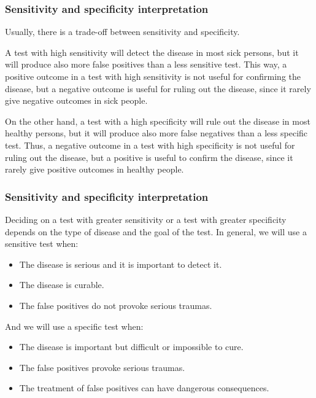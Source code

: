 \begin{frame}
\frametitle{Sensitivity and specificity interpretation}
Usually, there is a trade-off between sensitivity and specificity.  

A test with high sensitivity will detect the disease in most sick persons, but it will produce also more false positives than a less sensitive test. 
This way, a positive outcome in a test with high sensitivity is not useful for confirming the disease, but a negative outcome is useful for ruling out the disease, since it rarely give negative outcomes in sick people.

On the other hand, a test with a high specificity will rule out the disease in most healthy persons, but it will produce also more false negatives than a less specific test. 
Thus, a negative outcome in a test with high specificity is not useful for ruling out the disease, but a positive is useful to confirm the disease, since it rarely give positive outcomes in healthy people.  
\end{frame}


\begin{frame}
\frametitle{Sensitivity and specificity interpretation}
Deciding on a test with greater sensitivity or a test with greater specificity depends on the type of disease and the
goal of the test.
In general, we will use a sensitive test when:
\begin{itemize}
\item The disease is serious and it is important to detect it. 
\item The disease is curable. 
\item The false positives do not provoke serious traumas.
\end{itemize}

And we will use a specific test when:
\begin{itemize}
\item The disease is important but difficult or impossible to cure.
\item The false positives provoke serious traumas. 
\item The treatment of false positives can have dangerous consequences.  
\end{itemize}
\end{frame}


